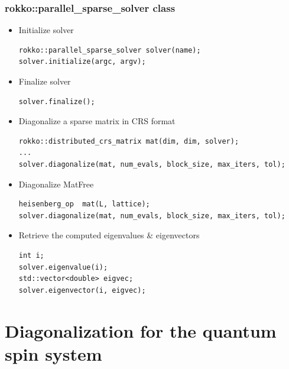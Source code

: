 \begin{frame}[c,fragile]
  \frametitle{rokko::parallel_sparse_solver class}
\vspace{-1\baselineskip}
  \begin{itemize}
  \item Initialize solver
\begin{lstlisting}
rokko::parallel_sparse_solver solver(name);
solver.initialize(argc, argv);
\end{lstlisting}
  \item Finalize solver
\begin{lstlisting}
solver.finalize();
\end{lstlisting}
  \item Diagonalize a sparse matrix in CRS format
\begin{lstlisting}
rokko::distributed_crs_matrix mat(dim, dim, solver);
...
solver.diagonalize(mat, num_evals, block_size, max_iters, tol);
\end{lstlisting}
  \item Diagonalize MatFree
\begin{lstlisting}
heisenberg_op  mat(L, lattice);
solver.diagonalize(mat, num_evals, block_size, max_iters, tol);
\end{lstlisting}
  \item Retrieve the computed eigenvalues \& eigenvectors
\begin{lstlisting}
int i;
solver.eigenvalue(i);
std::vector<double> eigvec;
solver.eigenvector(i, eigvec);
\end{lstlisting}
  \end{itemize}
\end{frame}



\section{Diagonalization for the quantum spin system}

